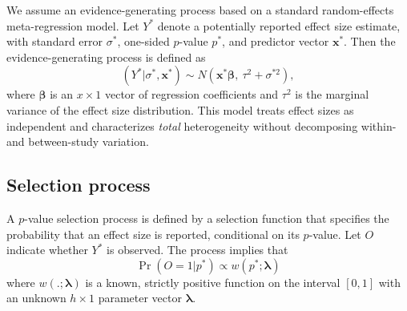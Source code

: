 \documentclass[
]{article}
\begin{document}
We assume an evidence-generating process based on a standard
random-effects meta-regression model. Let \(Y^*\) denote a potentially
reported effect size estimate, with standard error \(\sigma^*\),
one-sided \(p\)-value \(p^*\), and predictor vector \(\mathbf{x}^*\).
Then the evidence-generating process is defined as \begin{equation}
\label{eq:meta-mean-regression}
\left(Y^* | \sigma^*, \mathbf{x}^*\right) \sim N\left(\mathbf{x}^* \boldsymbol\beta, \ \tau^2 + \sigma^{*2}\right),
\end{equation} where \(\boldsymbol\beta\) is an \(x \times 1\) vector of
regression coefficients and \(\tau^2\) is the marginal variance of the
effect size distribution. This model treats effect sizes as independent
and characterizes \emph{total} heterogeneity without decomposing within-
and between-study variation.

\subsection{Selection process}\label{selection-process}

A \(p\)-value selection process is defined by a selection function that
specifies the probability that an effect size is reported, conditional
on its \(p\)-value. Let \(O\) indicate whether \(Y^*\) is observed. The
process implies that \begin{equation}
\label{eq:selection-process}
\Pr\left(O = 1 | p^* \right) \propto w\left(p^*; \boldsymbol\lambda \right)
\end{equation} where \(w\left(.; \boldsymbol\lambda\right)\) is a known,
strictly positive function on the interval \([0, 1]\) with an unknown
\(h \times 1\) parameter vector \(\boldsymbol\lambda\).
\end{document}
